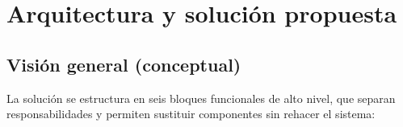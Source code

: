
\chapter{Arquitectura y solución propuesta}
\label{ch:arquitectura}

\section{Visión general (conceptual)}
\label{sec:vision-conceptual}

La solución se estructura en seis bloques funcionales de alto nivel, que separan responsabilidades y permiten sustituir componentes sin rehacer el sistema:
